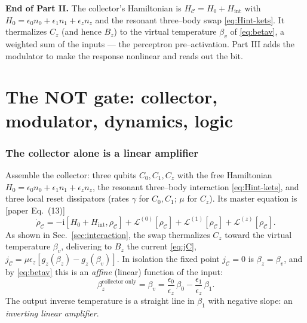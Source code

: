 \documentclass[11pt,a4paper]{article}
\newcommand{\ii}{\mathrm{i}}
\newcommand{\calL}{\mathcal{L}}
\newcommand{\calC}{\mathcal{C}}
\newcommand{\gz}{g_z}
\theoremstyle{definition}
\theoremstyle{remark}
\begin{document}
\begin{keybox}
\textbf{End of Part II.} The collector's Hamiltonian is
$H_{\calC}=H_0+H_{\mathrm{int}}$ with
$H_0=\epsilon_0 n_0+\epsilon_1 n_1+\epsilon_z n_z$ and the resonant
three--body swap \eqref{eq:Hint-kets}. It thermalizes $C_z$ (and hence
$B_z$) to the virtual temperature $\beta_v$ of \eqref{eq:betav}, a
weighted sum of the inputs --- the perceptron pre--activation. Part III
adds the modulator to make the response nonlinear and reads out the bit.
\end{keybox}

\part{The NOT gate: collector, modulator, dynamics, logic}
\label{part:notgate}

\section{The collector alone is a linear amplifier}
\label{sec:collector-linear}
Assemble the collector: three qubits $C_0,C_1,C_z$ with the free
Hamiltonian $H_0=\epsilon_0 n_0+\epsilon_1 n_1+\epsilon_z n_z$, the
resonant three--body interaction \eqref{eq:Hint-kets}, and three local
reset dissipators (rates $\gamma$ for $C_0,C_1$; $\mu$ for $C_z$). Its
master equation is [paper Eq.~(13)]
\begin{equation}
\dot\rho_{\calC} = -\ii[H_0+H_{\mathrm{int}},\rho_{\calC}]
+ \calL^{(0)}[\rho_{\calC}] + \calL^{(1)}[\rho_{\calC}]
+ \calL^{(z)}[\rho_{\calC}].
\label{eq:collector-me}
\end{equation}
As shown in Sec.~\ref{sec:interaction}, the swap thermalizes $C_z$ toward
the virtual temperature $\beta_v$, delivering to $B_z$ the current
\eqref{eq:jC}, $j_{\calC}=\mu\epsilon_z[\gz(\beta_z)-\gz(\beta_v)]$. In
isolation the fixed point $j_{\calC}=0$ is $\beta_z=\beta_v$, and by
\eqref{eq:betav} this is an \emph{affine} (linear) function of the input:
\begin{equation}
\beta_z^{\text{collector only}} = \beta_v
= \frac{\epsilon_0}{\epsilon_z}\,\beta_0
- \frac{\epsilon_1}{\epsilon_z}\,\beta_1 .
\label{eq:linear-response}
\end{equation}
The output inverse temperature is a straight line in $\beta_1$ with
negative slope: an \emph{inverting linear amplifier}.
\end{document}
